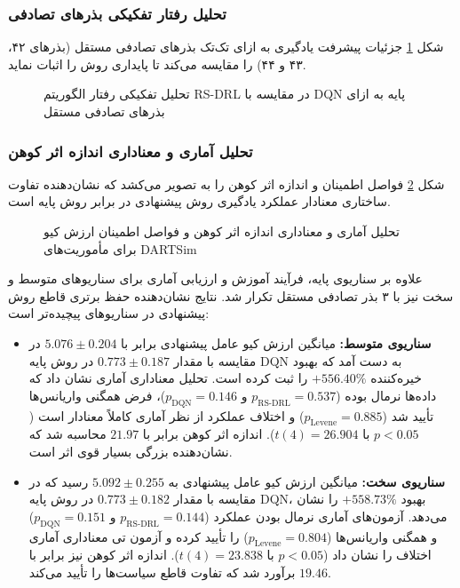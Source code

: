 \documentclass[oneside,openany,a4paper,12pt,draft]{article}
\begin{document}
\clearpage
\subsubsection{تحلیل رفتار تفکیکی بذرهای تصادفی}
شکل \ref{fig:dartsim_seeds_breakdown} جزئیات پیشرفت یادگیری به ازای تک‌تک بذرهای تصادفی مستقل (بذرهای ۴۲، ۴۳ و ۴۴) را مقایسه می‌کند تا پایداری روش را اثبات نماید.

\begin{figure}[H]
  \centering
  \caption{تحلیل تفکیکی رفتار الگوریتم RS-DRL در مقایسه با DQN پایه به ازای بذر‌های تصادفی مستقل}
  \label{fig:dartsim_seeds_breakdown}
\end{figure}

\clearpage
\subsubsection{تحلیل آماری و معناداری اندازه اثر کوهن}
شکل \ref{fig:dartsim_statistical_analysis} فواصل اطمینان و اندازه اثر کوهن را به تصویر می‌کشد که نشان‌دهنده تفاوت ساختاری معنادار عملکرد یادگیری روش پیشنهادی در برابر روش پایه است.

\begin{figure}[H]
  \centering
  \caption{تحلیل آماری و معناداری اندازه اثر کوهن و فواصل اطمینان ارزش کیو برای مأموریت‌های DARTSim}
  \label{fig:dartsim_statistical_analysis}
\end{figure}

علاوه بر سناریوی پایه، فرآیند آموزش و ارزیابی آماری برای سناریوهای متوسط و سخت نیز با ۳ بذر تصادفی مستقل تکرار شد. نتایج نشان‌دهنده حفظ برتری قاطع روش پیشنهادی  در سناریوهای پیچیده‌تر است:
\begin{itemize}
    \item \textbf{سناریوی متوسط:} میانگین ارزش کیو عامل پیشنهادی برابر با \textbf{$5.076 \pm 0.204$} در مقایسه با مقدار \textbf{$0.773 \pm 0.187$} در روش پایه DQN به دست آمد که بهبود خیره‌کننده \textbf{$+556.40\%$} را ثبت کرده است. تحلیل معناداری آماری نشان داد که داده‌ها نرمال بوده ($p_{\text{RS-DRL}} = 0.537$ و $p_{\text{DQN}} = 0.146$)، فرض همگنی واریانس‌ها تأیید شد ($p_{\text{Levene}} = 0.885$) و اختلاف عملکرد از نظر آماری کاملاً معنادار است ($p < 0.05$ با $t(4) = 26.904$). اندازه اثر کوهن برابر با \textbf{$21.97$} محاسبه شد که نشان‌دهنده بزرگی بسیار قوی اثر است.
    \item \textbf{سناریوی سخت:} میانگین ارزش کیو عامل پیشنهادی به \textbf{$5.092 \pm 0.255$} رسید که در مقایسه با مقدار \textbf{$0.773 \pm 0.182$} در روش پایه DQN، بهبود \textbf{$+558.73\%$} را نشان می‌دهد. آزمون‌های آماری نرمال بودن عملکرد ($p_{\text{RS-DRL}} = 0.144$ و $p_{\text{DQN}} = 0.151$) و همگنی واریانس‌ها ($p_{\text{Levene}} = 0.804$) را تأیید کرده و آزمون تی معناداری آماری اختلاف را نشان داد ($p < 0.05$ با $t(4) = 23.838$). اندازه اثر کوهن نیز برابر با \textbf{$19.46$} برآورد شد که تفاوت قاطع سیاست‌ها را تأیید می‌کند.
\end{itemize}
\end{document}
